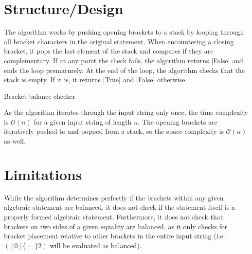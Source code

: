 \documentclass{report}
\begin{document}
\section{Structure/Design}
The algorithm works by pushing opening brackets to a stack by looping through all bracket characters in the original statement. When encountering a closing bracket, it pops the last element of the stack and compares if they are complementary. If at any point the check fails, the algorithm returns |False| and ends the loop prematurely. At the end of the loop, the algorithm checks that the stack is empty. If it is, it returns |True| and |False| otherwise.
\begin{algorithm}[H]
	\SetAlgoLined
	\SetNoFillComment
	\vspace{3mm}
	\caption{Bracket balance checker}
\end{algorithm}
As the algorithm iterates through the input string only once, the time complexity is \(\mathcal{O}(n)\) for a given input string of length \(n\). The opening brackets are iteratively pushed to and popped from a stack, so the space complexity is \(\mathcal{O}(n)\) as well.
\section{Limitations}
While the algorithm determines perfectly if the brackets within any given algebraic statement are balanced, it does not check if the statement itself is a properly formed algebraic statement. Furthermore, it does not check that brackets on two sides of a given equality are balanced, as it only checks for bracket placement relative to other brackets in the entire input string (i.e. \(([0]\{=\}2)\) will be evaluated as balanced).
\end{document}
